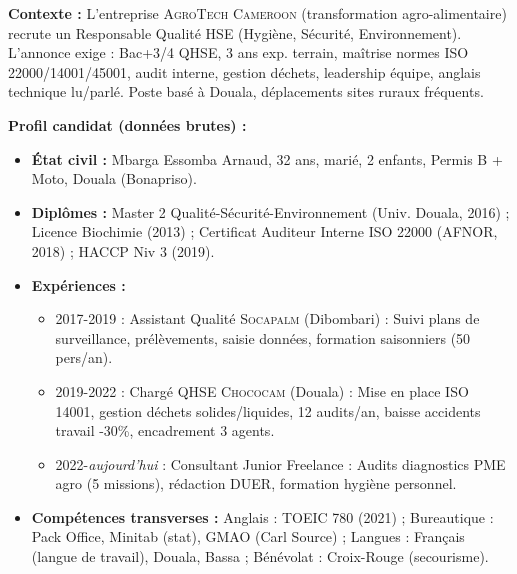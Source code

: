\documentclass[11pt]{article}
\begin{document}
\begin{exercice}
\textbf{Contexte :} L'entreprise \textsc{AgroTech Cameroon} (transformation agro-alimentaire) recrute un \og Responsable Qualité HSE \fg{} (Hygiène, Sécurité, Environnement). L'annonce exige : \og Bac+3/4 QHSE, 3 ans exp. terrain, maîtrise normes ISO 22000/14001/45001, audit interne, gestion déchets, leadership équipe, anglais technique lu/parlé. Poste basé à Douala, déplacements sites ruraux fréquents. \fg{}

\textbf{Profil candidat (données brutes) :}
\begin{itemize}
    \item \textbf{État civil :} Mbarga Essomba Arnaud, 32 ans, marié, 2 enfants, Permis B + Moto, Douala (Bonapriso).
    \item \textbf{Diplômes :} Master 2 Qualité-Sécurité-Environnement (Univ. Douala, 2016) ; Licence Biochimie (2013) ; Certificat Auditeur Interne ISO 22000 (AFNOR, 2018) ; HACCP Niv 3 (2019).
    \item \textbf{Expériences :}
    \begin{itemize}
        \item 2017-2019 : Assistant Qualité \textsc{Socapalm} (Dibombari) : Suivi plans de surveillance, prélèvements, saisie données, formation saisonniers (50 pers/an).
        \item 2019-2022 : Chargé QHSE \textsc{Chococam} (Douala) : Mise en place ISO 14001, gestion déchets solides/liquides, 12 audits/an, baisse accidents travail -30\%, encadrement 3 agents.
        \item 2022-\textit{aujourd'hui} : Consultant Junior Freelance : Audits diagnostics PME agro (5 missions), rédaction DUER, formation hygiène personnel.
    \end{itemize}
    \item \textbf{Compétences transverses :} Anglais : TOEIC 780 (2021) ; Bureautique : Pack Office, Minitab (stat), GMAO (Carl Source) ; Langues : Français (langue de travail), Douala, Bassa ; Bénévolat : Croix-Rouge (secourisme).
\end{itemize}


\end{exercice}
\end{document}
